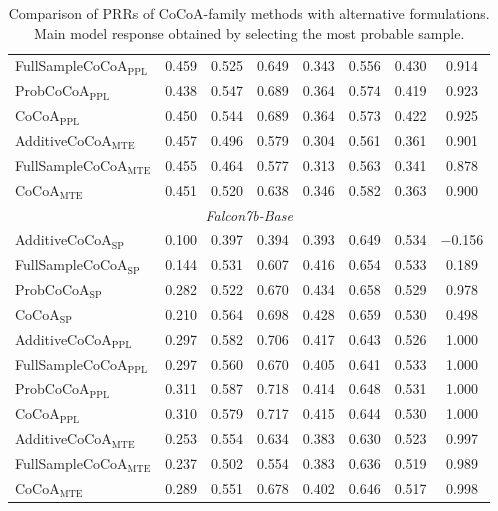 \documentclass[11pt]{article}
\begin{document}
\begin{table}[htbp]
{\begin{tabular}{l ccccccc}
FullSampleCoCoA$_{\mathrm{PPL}}$ & 0.459 & 0.525 & 0.649 & 0.343 & 0.556 & 0.430 & 0.914 \\
ProbCoCoA$_{\mathrm{PPL}}$ & 0.438 & 0.547 & 0.689 & 0.364 & 0.574 & 0.419 & 0.923 \\
CoCoA$_{\mathrm{PPL}}$ & 0.450 & 0.544 & 0.689 & 0.364 & 0.573 & 0.422 & 0.925 \\
AdditiveCoCoA$_{\mathrm{MTE}}$ & 0.457 & 0.496 & 0.579 & 0.304 & 0.561 & 0.361 & 0.901 \\
FullSampleCoCoA$_{\mathrm{MTE}}$ & 0.455 & 0.464 & 0.577 & 0.313 & 0.563 & 0.341 & 0.878 \\
CoCoA$_{\mathrm{MTE}}$ & 0.451 & 0.520 & 0.638 & 0.346 & 0.582 & 0.363 & 0.900 \\
\midrule
\multicolumn{8}{c}{\textit{Falcon7b-Base}} \\
\midrule
AdditiveCoCoA$_{\mathrm{SP}}$ & 0.100 & 0.397 & 0.394 & 0.393 & 0.649 & 0.534 & $-$0.156 \\
FullSampleCoCoA$_{\mathrm{SP}}$ & 0.144 & 0.531 & 0.607 & 0.416 & 0.654 & 0.533 & 0.189 \\
ProbCoCoA$_{\mathrm{SP}}$ & 0.282 & 0.522 & 0.670 & 0.434 & 0.658 & 0.529 & 0.978 \\
CoCoA$_{\mathrm{SP}}$ & 0.210 & 0.564 & 0.698 & 0.428 & 0.659 & 0.530 & 0.498 \\
AdditiveCoCoA$_{\mathrm{PPL}}$ & 0.297 & 0.582 & 0.706 & 0.417 & 0.643 & 0.526 & 1.000 \\
FullSampleCoCoA$_{\mathrm{PPL}}$ & 0.297 & 0.560 & 0.670 & 0.405 & 0.641 & 0.533 & 1.000 \\
ProbCoCoA$_{\mathrm{PPL}}$ & 0.311 & 0.587 & 0.718 & 0.414 & 0.648 & 0.531 & 1.000 \\
CoCoA$_{\mathrm{PPL}}$ & 0.310 & 0.579 & 0.717 & 0.415 & 0.644 & 0.530 & 1.000 \\
AdditiveCoCoA$_{\mathrm{MTE}}$ & 0.253 & 0.554 & 0.634 & 0.383 & 0.630 & 0.523 & 0.997 \\
FullSampleCoCoA$_{\mathrm{MTE}}$ & 0.237 & 0.502 & 0.554 & 0.383 & 0.636 & 0.519 & 0.989 \\
CoCoA$_{\mathrm{MTE}}$ & 0.289 & 0.551 & 0.678 & 0.402 & 0.646 & 0.517 & 0.998 \\
\bottomrule
\end{tabular}%
}
\caption{Comparison of PRRs of CoCoA-family methods with alternative formulations. Main model response obtained by selecting the most probable sample.}
\label{tab:cocoa_table9}
\end{table}
\end{document}
